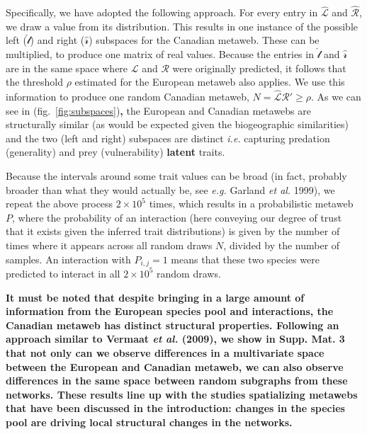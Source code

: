 \documentclass[11pt]{article}
\makeatletter
\def\maxwidth{\ifdim\Gin@nat@width>\linewidth\linewidth
\else\Gin@nat@width\fi}
\let\Oldincludegraphics\includegraphics
\renewcommand{\includegraphics}[1]{\Oldincludegraphics[width=\maxwidth]{#1}}
\providecommand{\DIFaddtex}[1]{{\bf #1}} %
\providecommand{\DIFdeltex}[1]{} %
\providecommand{\DIFaddbegin}{\protect\color{blue}} %
\providecommand{\DIFaddend}{\protect\color{black}} %
\providecommand{\DIFdelbegin}{\protect\color{red}} %
\providecommand{\DIFdelend}{\protect\color{black}} %
\providecommand{\DIFadd}[1]{\texorpdfstring{\DIFaddtex{#1}}{#1}} %
\providecommand{\DIFdel}[1]{\texorpdfstring{\DIFdeltex{#1}}{}} %
\newcommand{\DIFscaledelfig}{0.5}
\newlength{\DIFdelgraphicswidth} %
\newlength{\DIFdelgraphicsheight} %
\newcommand{\DIFaddincludegraphics}[2][]{{\color{blue}\fbox{\DIFOincludegraphics[#1]{#2}}}} %
\newcommand{\DIFdelincludegraphics}[2][]{%
\sbox{\DIFdelgraphicsbox}{\DIFOincludegraphics[#1]{#2}}%
\settoboxwidth{\DIFdelgraphicswidth}{\DIFdelgraphicsbox} %
\settoboxtotalheight{\DIFdelgraphicsheight}{\DIFdelgraphicsbox} %
\scalebox{\DIFscaledelfig}{%
\parbox[b]{\DIFdelgraphicswidth}{\usebox{\DIFdelgraphicsbox}\\[-\baselineskip] \rule{\DIFdelgraphicswidth}{0em}}\llap{\resizebox{\DIFdelgraphicswidth}{\DIFdelgraphicsheight}{%
\setlength{\unitlength}{\DIFdelgraphicswidth}%
\begin{picture}(1,1)%
\thicklines\linethickness{2pt} %
{\color[rgb]{1,0,0}\put(0,0){\framebox(1,1){}}}%
{\color[rgb]{1,0,0}\put(0,0){\line( 1,1){1}}}%
{\color[rgb]{1,0,0}\put(0,1){\line(1,-1){1}}}%
\end{picture}%
}\hspace*{3pt}}} %
} %
\DeclareRobustCommand{\DIFaddbegin}{\DIFOaddbegin \let\includegraphics\DIFaddincludegraphics} %
\DeclareRobustCommand{\DIFaddend}{\DIFOaddend \let\includegraphics\DIFOincludegraphics} %
\DeclareRobustCommand{\DIFdelbegin}{\DIFOdelbegin \let\includegraphics\DIFdelincludegraphics} %
\DeclareRobustCommand{\DIFdelend}{\DIFOaddend \let\includegraphics\DIFOincludegraphics} %
\makeatother
\begin{document}
Specifically, we have adopted the following approach. For every entry in
\(\hat{\mathscr{L}}\) and \(\hat{\mathscr{R}}\), we draw a value from
its distribution. This results in one instance of the possible left
(\(\hat{\mathscr{l}}\)) and right (\(\hat{\mathscr{r}}\)) subspaces for
the Canadian metaweb. These can be multiplied, to produce one matrix of
real values. Because the entries in \(\hat{\mathscr{l}}\) and
\(\hat{\mathscr{r}}\) are in the same space where \(\mathscr{L}\) and
\(\mathscr{R}\) were originally predicted, it follows that the threshold
\(\rho\) estimated for the European metaweb also applies. We use this
information to produce one random Canadian metaweb,
\DIFdelbegin \DIFdel{\(N = \hat{\mathscr{L}}\)\(\hat{\mathscr{R}}' \ge \rho\)}\DIFdelend \DIFaddbegin \DIFadd{\(N = \hat{\mathscr{L}}\hat{\mathscr{R}}' \ge \rho\)}\DIFaddend . As we can see in
(fig.~\ref{fig:subspaces})\DIFaddbegin \DIFadd{, }\DIFaddend the European and Canadian metawebs are
structurally similar (as would be expected given the biogeographic
similarities) and the two (left and right) subspaces are distinct
\emph{i.e.} capturing predation (generality) and prey (vulnerability)
\DIFaddbegin \DIFadd{latent }\DIFaddend traits.

Because the intervals around some trait values can be broad (in fact,
probably broader than what they would actually be, see \emph{e.g.}
Garland \emph{et al.} 1999), we repeat the above process
\(2\times 10^5\) times, which results in a probabilistic metaweb \(P\),
where the probability of an interaction (here conveying our degree of
trust that it exists given the inferred trait distributions) is given by
the number of times where it appears across all random draws \(N\),
divided by the number of samples. An interaction with \(P_{i,j} = 1\)
means that these two species were predicted to interact in all
\(2\times 10^5\) random draws.

\DIFaddbegin \DIFadd{It must be noted that despite bringing in a large amount of information
from the European species pool and interactions, the Canadian metaweb
has distinct structural properties. Following an approach similar to
Vermaat \emph{et al.} (2009), we show in Supp. Mat. 3 that not only can
we observe differences in a multivariate space between the European and
Canadian metaweb, we can also observe differences in the same space
between random subgraphs from these networks. These results line up with
the studies spatializing metawebs that have been discussed in the
introduction: changes in the species pool are driving local structural
changes in the networks.
}
\end{document}
